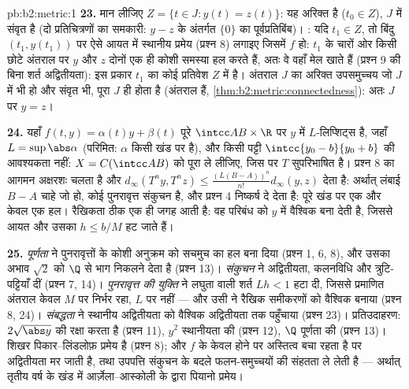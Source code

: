 \begin{solution}{pb:b2:metric:1}
\textbf{23.} मान लीजिए $Z = \{t \in J : y(t) = z(t)\}$: यह अरिक्त है ($t_0 \in Z$), $J$ में संवृत है (दो
 प्रतिचित्रणों का समकारी: $y - z$ के अंतर्गत $\{0\}$ का पूर्वप्रतिबिंब)।
: यदि $t_1 \in Z$, तो बिंदु $(t_1, y(t_1))$ पर ऐसे आयत में स्थानीय प्रमेय (प्रश्न 8)
लगाइए जिसमें $f$  हो: $t_1$ के चारों ओर किसी छोटे अंतराल पर $y$
और $z$ दोनों एक ही कोशी समस्या हल करते हैं, अतः वे वहाँ मेल खाते हैं
(प्रश्न 9 की बिना शर्त अद्वितीयता): इस प्रकार $t_1$ का कोई प्रतिवेश $Z$
में है। अंतराल $J$ का अरिक्त उपसमुच्चय जो $J$ में  भी हो और
संवृत भी, पूरा $J$ ही होता है (अंतराल  हैं, \cref{thm:b2:metric:connectedness}): अतः $J$ पर
$y = z$।

\textbf{24.} यहाँ $f(t, y) = \alpha(t)y + \beta(t)$ पूरे $\intcc AB \times \R$ पर $y$ में $L$-लिप्शिट्स है, जहाँ $L =
\sup\abs\alpha$
(परिमित: $\alpha$ किसी खंड पर  है), और किसी पट्टी $\intcc{y_0 - b}{y_0 + b}$ की आवश्यकता नहीं:
$X = C(\intcc
AB)$ को पूरा ले लीजिए, जिस पर $T$ सुपरिभाषित है। प्रश्न 8 का आगमन
अक्षरशः चलता है और $d_\infty(T^ny, T^nz) \leq
\frac{(L(B - A))^n}{n!}d_\infty(y, z)$ देता है: अर्थात् लंबाई $B - A$ चाहे जो हो, कोई
पुनरावृत्त संकुचन है, और प्रश्न 4 निष्कर्ष दे देता है: पूरे खंड पर एक
और केवल एक हल। रैखिकता ठीक एक ही जगह आती है: वह  परिबंध को $y$
में वैश्विक बना देती है, जिससे आयत और उसका $h \leq b/M$ हट जाते हैं।

\textbf{25.} \emph{पूर्णता} ने पुनरावृत्तों के कोशी अनुक्रम को सचमुच का
हल बना दिया (प्रश्न 1, 6, 8), और उसका अभाव $\sqrt2$ को $\Q$ से भाग निकलने
देता है (प्रश्न 13)। \emph{संकुचन} ने अद्वितीयता, कलनविधि और
त्रुटि-पट्टियाँ दीं (प्रश्न 7, 14)। \emph{पुनरावृत्त की युक्ति} ने
लघुता वाली शर्त $Lh < 1$ हटा दी, जिससे प्रमाणित अंतराल केवल $M$ पर निर्भर
रहा, $L$ पर नहीं --- और उसी ने रैखिक समीकरणों को वैश्विक बनाया (प्रश्न
8, 24)। \emph{संबद्धता} ने स्थानीय अद्वितीयता को वैश्विक अद्वितीयता तक
पहुँचाया (प्रश्न 23)। प्रतिउदाहरण: $2\sqrt{\abs y}$  की रक्षा करता है
(प्रश्न 11), $y^2$ स्थानीयता की (प्रश्न 12), $\Q$ पूर्णता की (प्रश्न 13)।
शिखर पिकार--लिंडलोफ़ प्रमेय है (प्रश्न 8); और $f$ के केवल  होने पर
अस्तित्व बचा रहता है पर अद्वितीयता मर जाती है, तथा उपपत्ति संकुचन के
बदले फलन-समुच्चयों की संहतता ले लेती है --- अर्थात् तृतीय वर्ष के खंड
में आर्ज़ेला--आस्कोली के द्वारा पियानो प्रमेय।
\end{solution}
